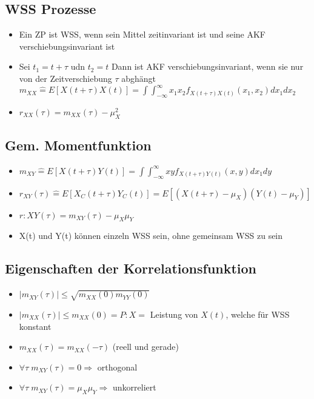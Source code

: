\documentclass{article}
\begin{document}
\subsection{WSS Prozesse}
\begin{itemize}
\item Ein ZP ist WSS, wenn sein Mittel zeitinvariant ist und seine AKF verschiebungsinvariant ist
\item Sei $t_1 = t + \tau$ udn $ t_2 = t$ Dann ist AKF verschiebungsinvariant, wenn sie nur von der Zeitverschiebung $\tau$ abghängt \\
$m_{XX} \hat{=} E[X(t+\tau)X(t)] = \int\int_{-\infty}^\infty x_1x_2f_{X(t+\tau)X(t)}(x_1,x_2)dx_1 dx_2 $
\item $r_{XX}(\tau) = m_{XX}(\tau)-\mu_X^2$
\end{itemize}


\subsection{Gem. Momentfunktion}
\begin{itemize}
\item$m_{XY} \hat{=} E[X(t+\tau)Y(t)] = \int\int_{-\infty}^\infty xyf_{X(t+\tau)Y(t)}(x,y)dx_1 dy $
\item $r_{XY}(\tau) \hat{=} E[X_C(t+\tau)Y_C(t)] = E[(X(t+\tau)-\mu_X)(Y(t)-\mu_Y)]$
\item $r:{XY}(\tau) = m_{XY}(\tau) -\mu_X\mu_Y$
\item X(t) und Y(t) können einzeln WSS sein, ohne gemeinsam WSS zu sein
\end{itemize}


\subsection{Eigenschaften der Korrelationsfunktion}
\begin{itemize}
\item $|m_{XY}(\tau)| \leq \sqrt{m_{XX}(0)m_{YY}(0)}$
\item$|m_{XX}(\tau)| \leq m_{XX}(0) = P:X =$ Leistung von $X(t)$, welche für WSS konstant
\item $m_{XX}(\tau) = m_{XX}(-\tau)$ (reell und gerade)
\item $ \forall \tau \; m_{XY}(\tau) = 0 \Rightarrow$ orthogonal
\item $ \forall \tau \; m_{XY}(\tau) = \mu_X  \mu_Y \Rightarrow $  unkorreliert
\end{itemize}
\end{document}
